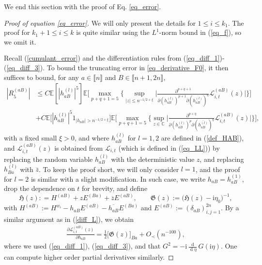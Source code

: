 \documentclass[10pt,reqno]{amsart}
\numberwithin{equation}{section}
\numberwithin{figure}{section}
\theoremstyle{plain}
\newcommand{\C}{{\mathbb{C}}}
\newcommand{\ii}{\mathrm{i}}
\newcommand{\<}{\langle}
\renewcommand{\>}{\rangle}
\newcommand{\E}{\mathbb{E}}
\newcommand{\dd}{\operatorname{d}\!{}}
\newcommand{\II}{\mathcal{L}_{i,t}}
\begin{document}
We end this section with the proof of Eq. \eqref{eq_error}.


\begin{proof}[Proof of equation \eqref{eq_error}]
	We will only present the details for $1\leq i\leq k_1$. The proof for $k_1+1 \leq i\leq k$ is quite similar using the $L^{1}$-norm bound in (\ref{eq_f}), so we omit it. 
	
	Recall  (\ref{cumulant_error}) and the differentiation rules from (\ref{eq_diff_1})-(\ref{eq_diff_3}). To bound the truncating error in \eqref{eq_derivative_F0}, it then suffices to bound, for any $a\in \llbracket n \rrbracket $ and $B\in \llbracket n+1,2n \rrbracket$, 
	\begin{align}\label{R_5}
		|R^{(aB)}_{5}| &\leq  C \E[ |h^{(l)}_{aB}|^{5}] \E \Big[ \max_{p+q+1=5} \Big\{ \sup_{|z| \leq n^{-1/2+\xi}} \Big| \frac{\partial^{p+q+1} }{\partial (h^{(l)}_{aB})^{p+1} \partial (\overline{h^{(l)}_{aB}})^{q} } \II^{(aB)}(z) \Big| \Big\} \Big]\nonumber\\
		&+C  \E \Big[ |h^{(l)}_{aB}|^{5} 1_{|h_{aB}|> n^{-1/2+\xi}}\Big] \E \Big[\max_{p+q+1=5} \Big\{ \sup_{z \in \C} \Big| \frac{\partial^{p+q} }{\partial (h^{(l)}_{aB})^{p} \partial (\overline{h^{(l)}_{aB}})^{q} } \II^{(aB)}(z)  \Big| \Big\} \Big],
	\end{align}
	with a fixed small $\xi>0$, and where $h^{(l)}_{aB}$ for $l=1,2$ are defined in (\ref{def_HAB}), and $\II^{(aB)}(z)$ is obtained from $\II$ (which is defined in (\ref{eq_LL})) by replacing the random variable $h^{(l)}_{aB}$  with the deterministic value $z$, and replacing $h^{(l)}_{Ba}$ with $\overline{z}$. To keep the proof short, we will only consider $l=1$, and the proof for $l=2$ is similar with a slight modification. In such case, we write $h_{aB}=h_{aB}^{(1)}$, drop the dependence on $t$ for brevity, and define
		$$\mathfrak{H}(z): = H^{(aB)}+z E^{(Ba)}+\overline{z} E^{(aB)},\qquad \mathfrak{G}(z) :=\big( \mathfrak{H}(z) -\ii \eta_0 \big)^{-1},$$
with  $H^{(aB)}:=H^{w_i}-h_{aB}E^{(aB)}-\overline{h_{aB}}E^{(Ba)}$ and $E^{(aB)}:=(\delta_{aB})_{i,j=1}^{2n}$. By a similar argument as in (\ref{diff_L}), we obtain
\begin{align}
	\frac{\partial \II^{(aB)}(z) }{\partial h_{aB}}= \frac{1}{2}\big[\mathfrak{G}(z)\big]_{Ba} +O_\prec(n^{-100}),
\end{align}
where we used (\ref{eq_diff_1}), (\ref{eq_diff_3}), and that $G^2=-\ii \frac{\dd}{\dd \eta} G(\ii \eta)$. One can compute higher order partial derivatives similarly.


\end{proof}
\end{document}

